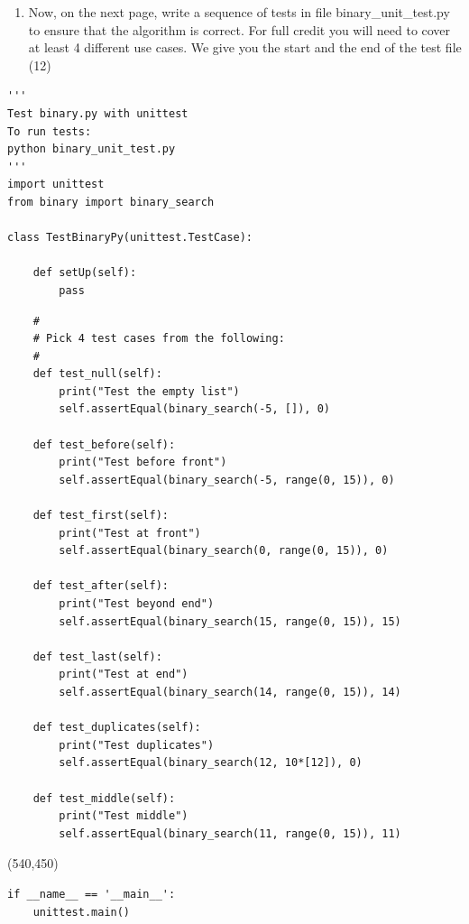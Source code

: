 \documentclass[10pt]{article}
\begin{document}
\begin{enumerate}
\begin{enumerate}
	\item Now, on the next page, write a sequence of tests in file binary\_unit\_test.py to ensure that the algorithm is correct. For full credit you will need to cover at least 4 different use cases. We give you the start and the end of the test file (12)
\end{enumerate}
\newpage
\begin{lstlisting}
'''
Test binary.py with unittest
To run tests:
python binary_unit_test.py
'''
import unittest
from binary import binary_search

class TestBinaryPy(unittest.TestCase):

    def setUp(self):
        pass
\end{lstlisting}
\beginanswers
\begin{lstlisting}
    #
    # Pick 4 test cases from the following:
    #
    def test_null(self):
        print("Test the empty list")
        self.assertEqual(binary_search(-5, []), 0)

    def test_before(self):
        print("Test before front")
        self.assertEqual(binary_search(-5, range(0, 15)), 0)

    def test_first(self):
        print("Test at front")
        self.assertEqual(binary_search(0, range(0, 15)), 0)

    def test_after(self):
        print("Test beyond end")
        self.assertEqual(binary_search(15, range(0, 15)), 15)

    def test_last(self):
        print("Test at end")
        self.assertEqual(binary_search(14, range(0, 15)), 14)

    def test_duplicates(self):
        print("Test duplicates")
        self.assertEqual(binary_search(12, 10*[12]), 0)

    def test_middle(self):
        print("Test middle")
        self.assertEqual(binary_search(11, range(0, 15)), 11)
\end{lstlisting}
\else
\hspace*{-0.4in}\framebox(540,450){}
\fi
\begin{lstlisting}
if __name__ == '__main__':
    unittest.main()
\end{lstlisting}

\end{enumerate}
\end{document}

